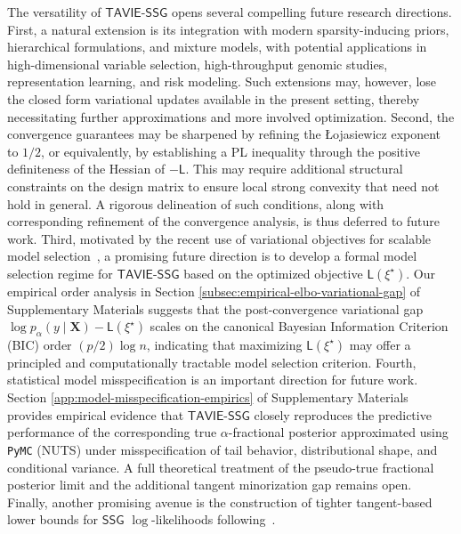 \documentclass[12pt]{article}
\numberwithin{equation}{section}
\newcommand{\ssg}{\mathsf{SSG}}
\newcommand{\tssg}{\mathsf{TAVIE}\text{-}\mathsf{SSG}}
\begin{document}
The versatility of $\tssg$ opens several compelling future research directions. First, a natural extension is its integration with modern sparsity-inducing priors, {hierarchical formulations, and mixture models}, with potential applications in high-dimensional variable selection, high-throughput genomic studies, representation learning, and risk modeling. {Such extensions may, however, lose the closed form variational updates available in the present setting, thereby necessitating further approximations and more involved optimization.}
Second, the convergence guarantees may be sharpened by refining the \L{}ojasiewicz exponent to $1/2$, or equivalently, by establishing a PL inequality through the positive definiteness of the Hessian of $-\mathsf{L}$. This may require additional structural constraints on the design matrix to ensure local strong convexity that need not hold in general. A rigorous delineation of such conditions, along with corresponding refinement of the convergence analysis, is thus deferred to future work.
Third, motivated by the recent use of variational objectives for scalable model selection~\citep{cheriefabdellatif2019elbo,ZhangYang2024MFVBModelSelection}, a promising future direction is to develop a formal model selection regime for $\tssg$ based on the optimized objective $\mathsf{L}(\xi^{\star})$. Our empirical order analysis in Section \ref{subsec:empirical-elbo-variational-gap} of Supplementary Materials suggests that the post-convergence variational gap $\log p_{\alpha}(y\mid \mathbf{X}) - \mathsf{L}(\xi^{\star})$ scales on the canonical Bayesian Information Criterion (BIC) order $(p/2)\log n$, indicating that maximizing $\mathsf{L}(\xi^{\star})$ may offer a principled and computationally tractable model selection criterion. 
Fourth, statistical model misspecification is an important direction for future work. Section \ref{app:model-misspecification-empirics} of Supplementary Materials provides empirical evidence that $\tssg$ closely reproduces the predictive performance of the corresponding true $\alpha$-fractional posterior approximated using \texttt{PyMC} (NUTS) under misspecification of tail behavior, distributional shape, and conditional variance. A full theoretical treatment of the pseudo-true fractional posterior limit and the additional tangent minorization gap remains open.
Finally, another promising avenue is the construction of {tighter tangent-based lower bounds} for $\ssg$ $\log$-likelihoods following~\cite{durante}.

\end{document}
